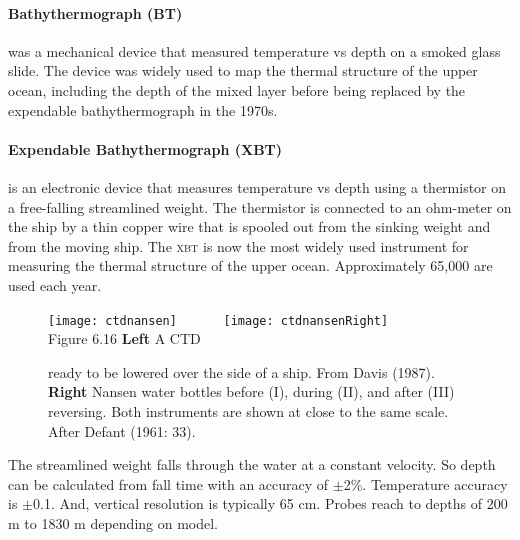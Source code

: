 \paragraph{Bathythermograph (BT)} was a mechanical device that measured
 temperature vs depth on a smoked
glass slide. The device was widely used to map the thermal
structure of the upper ocean, including the depth of the mixed
layer before being replaced by the expendable
bathythermograph in the 1970s.

\paragraph{Expendable Bathythermograph (XBT)} is an electronic device that
measures temperature vs depth using a thermistor on a
free-falling streamlined weight. The thermistor is connected to an
ohm-meter on the ship by a thin copper wire that is spooled out
from the sinking weight and from the moving ship. The \textsc{xbt}
is now the most widely used instrument for measuring the thermal
structure of the upper ocean. Approximately 65,000 are used each
year.

\begin{figure}[t!]
\texttt{[image: ctdnansen]}
\ \ \ \ \ \
\texttt{[image: ctdnansenRight]}
\ \ \ \ \ \ \\
\footnotesize
Figure 6.16 \textbf{Left} A CTD \rule{0mm}{4ex}ready to be lowered
over the side of a ship. From Davis (1987). \textbf{Right} Nansen water bottles
before (I), during (II), and after (III) reversing. Both instruments are shown
at close to the same scale. After Defant (1961: 33).
\label{fig:ctdnansen}
\vspace{-3ex}
\end{figure}

The streamlined weight falls through the water at a constant velocity. So
depth can be calculated from fall time with an accuracy of
$\pm$2\%.  Temperature accuracy\index{accuracy!temperature!XBT} is $\pm$0.1\degrees{C}.
And, vertical resolution is typically 65 cm. Probes reach to depths of 200 m to 1830 m
depending on model.

